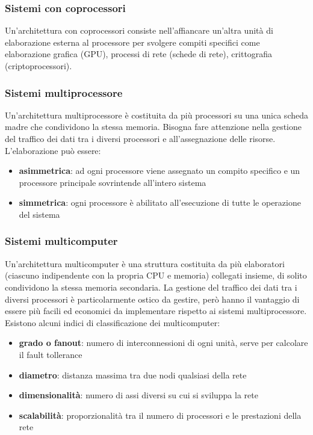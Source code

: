 \documentclass[a4paper]{article}
\begin{document}
\subsubsection*{Sistemi con coprocessori}
Un'architettura con coprocessori consiste nell'affiancare un'altra unità di elaborazione esterna al processore per svolgere compiti
specifici come elaborazione grafica (GPU), processi di rete (schede di rete), crittografia (criptoprocessori).

\subsubsection*{Sistemi multiprocessore}
Un'architettura multiprocessore è costituita da più processori su una unica scheda madre che condividono la stessa memoria.
Bisogna fare attenzione nella gestione del traffico dei dati tra i diversi processori e all'assegnazione delle risorse.
L'elaborazione può essere:
\begin{itemize}
	\item \textbf{asimmetrica}: ad ogni processore viene assegnato un compito specifico e un processore principale sovrintende
	all’intero sistema
	\item \textbf{simmetrica}: ogni processore è abilitato all’esecuzione di tutte le operazione del sistema
\end{itemize}

\subsubsection*{Sistemi multicomputer}
Un'architettura multicomputer è una struttura costituita da più elaboratori (ciascuno indipendente con la propria CPU e memoria)
collegati insieme, di solito condividono la stessa memoria secondaria. La gestione del traffico dei dati tra i diversi processori
è particolarmente ostico da gestire, però hanno il vantaggio di essere più facili ed economici da implementare rispetto ai sistemi
multiprocessore. Esistono alcuni indici di classificazione dei multicomputer:
\begin{itemize}
	\item \textbf{grado o fanout}: numero di interconnessioni di ogni unità, serve per calcolare il fault tollerance
	\item \textbf{diametro}: distanza massima tra due nodi qualsiasi della rete
	\item \textbf{dimensionalità}: numero di assi diversi su cui si sviluppa la rete
	\item \textbf{scalabilità}: proporzionalità tra il numero di processori e le prestazioni della rete
\end{itemize}
\end{document}
